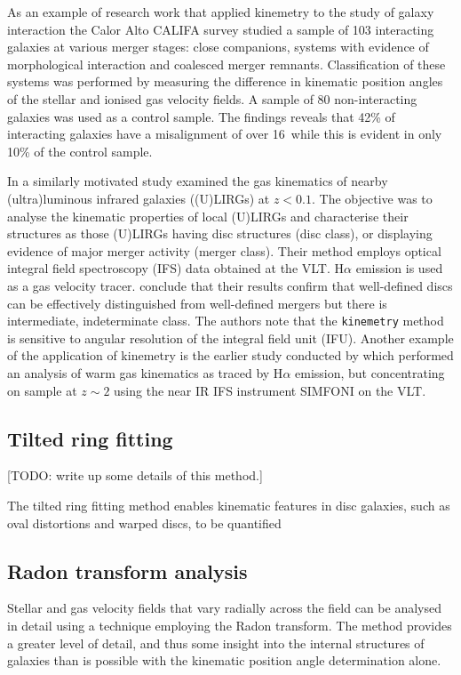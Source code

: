 As an example of research work that applied kinemetry to the study of galaxy interaction the Calor Alto CALIFA survey \citet{2015A&A...582A..21B} studied a sample of 103 interacting galaxies at various merger stages: close companions, systems with evidence of morphological interaction and coalesced merger remnants. Classification of these systems was performed by measuring the difference in kinematic position angles of the stellar and ionised gas velocity fields. A sample of 80 non-interacting galaxies was used as a control sample. The findings reveals that 42\% of interacting galaxies have a misalignment of over 16\textdegree\ while this is evident in only 10\% of the control sample.

In a similarly motivated study \citet{2016A&A...591A..85B} examined the gas kinematics of nearby (ultra)luminous infrared galaxies ((U)LIRGs) at $z<0.1$. The objective was to analyse the kinematic properties of local (U)LIRGs and characterise their structures as those (U)LIRGs having disc structures (disc class), or displaying evidence of major merger activity (merger class). Their method employs optical integral field spectroscopy (IFS) data obtained at the VLT. H$\alpha$ emission is used as a gas velocity tracer. \citet{2016A&A...591A..85B} conclude that their results confirm that well-defined discs can be effectively distinguished from well-defined mergers but there is intermediate, indeterminate class. The authors note that the \texttt{kinemetry} method is sensitive to angular resolution of the integral field unit (IFU). Another example of the application of kinemetry is the earlier study conducted by \citet{2008ApJ...682..231S} which performed an  analysis of warm gas kinematics as traced by H$\alpha$ emission, but concentrating on sample at $z\sim2$ using the near IR IFS instrument SIMFONI on the VLT.

\subsection{Tilted ring fitting}
\label{sec:tilted-ring-fitting}

[TODO: write up some details of this method.]

The tilted ring fitting method enables kinematic features in disc galaxies, such as oval distortions and warped discs, to be quantified  \citep[see e.g.][]{1978PhDT.......195B,1981AJ.....86.1825B,2007A&A...468..731J}

\subsection{Radon transform analysis} 
Stellar and gas velocity fields that vary radially across the field can be analysed in detail using a technique employing the Radon transform. The method provides a greater level of detail, and thus some insight into the internal structures of galaxies than is possible with the kinematic position angle determination alone.


